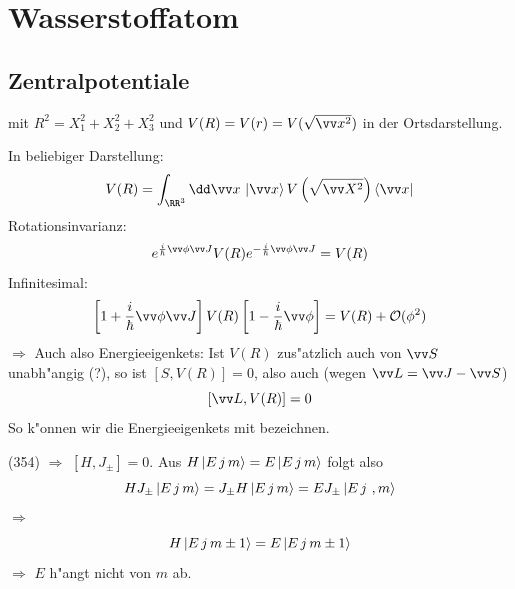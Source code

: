 \documentclass[a4paper]{scrartcl}
\begin{document}
{\section{Wasserstoffatom}

\subsection{Zentralpotentiale}

mit $R^2 = X_1^2 + X_2^2 + X_3^2$ und $V(R) = V(r) = V(\sqrt{\vv x^2})$ in der Ortsdarstellung.

In beliebiger Darstellung:
$$V(R) = \int_{\RR^3} \dd \vv x \, \Ket{\vv x} V\left(\sqrt{ \vv X^2}\right) \Bra{\vv x}$$
Rotationsinvarianz:
$$e^{\frac i \hbar \vv \phi \vv J} V(R) e^{- \frac i \hbar \vv \phi \vv J} = V(R)$$
Infinitesimal:
$$\left[ 1 + \frac i \hbar \vv \phi \vv J \right] V(R) \left[1 - \frac i \hbar \vv \phi \right] = V(R) + \mathcal O(\phi^2)$$
$\Longrightarrow$
Auch
also 
Energieeigenkets:
Ist $V(R)$ zus"atzlich auch von $\vv S$ unabh"angig (?), so ist $[S, V(R)] = 0$, also auch (wegen $\vv L = \vv J - \vv S$)
$$\left[ \vv L, V(R) \right] = 0$$
So k"onnen wir die Energieeigenkets mit
bezeichnen.

(354) $\Longrightarrow$ $[H, J_\pm] = 0$. Aus $H \Ket{ E \, j \, m} = E \Ket{ E \, j \, m }$ folgt also
$$H J_\pm \Ket{E \, j \, m} = J_\pm H \Ket{E \, j \, m} = E J_\pm \Ket{ E \, j \ , m }$$
$\Longrightarrow$
$$H \Ket{E \, j \, m \pm 1} = E \Ket{ E \, j \, m\pm 1}$$
$\Longrightarrow$ $E$ h"angt nicht von $m$ ab.

}
\end{document}
